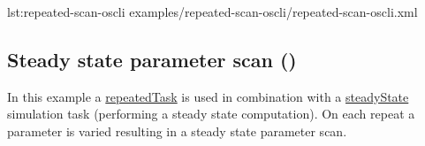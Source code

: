 {lst:repeated-scan-oscli}
{examples/repeated-scan-oscli/repeated-scan-oscli.xml}

\subsection{Steady state parameter scan ()}
In this example a \hyperref[class:repeatedTask]{repeatedTask} is used in combination with a \hyperref[class:steadyState]{steadyState} simulation task (performing a steady state computation). On each repeat a parameter is varied resulting in a steady state parameter scan.


